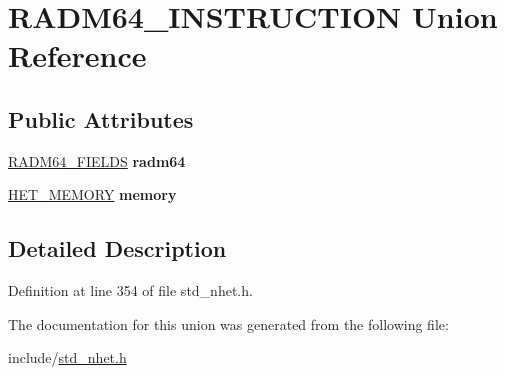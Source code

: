 \hypertarget{unionRADM64__INSTRUCTION}{}\section{R\+A\+D\+M64\+\_\+\+I\+N\+S\+T\+R\+U\+C\+T\+I\+ON Union Reference}
\label{unionRADM64__INSTRUCTION}
\subsection*{Public Attributes}
\begin{DoxyCompactItemize}
\item 
\mbox{\label{unionRADM64__INSTRUCTION_a638272421a08bd325643bc0d2bee015d}} 
\mbox{\hyperlink{structRADM64__format}{R\+A\+D\+M64\+\_\+\+F\+I\+E\+L\+DS}} {\bfseries radm64}
\item 
\mbox{\label{unionRADM64__INSTRUCTION_aac238d348b102300e8ea95b94adb5c41}} 
\mbox{\hyperlink{structmemory__format}{H\+E\+T\+\_\+\+M\+E\+M\+O\+RY}} {\bfseries memory}
\end{DoxyCompactItemize}


\subsection{Detailed Description}


Definition at line 354 of file std\+\_\+nhet.\+h.



The documentation for this union was generated from the following file\+:\begin{DoxyCompactItemize}
\item 
include/\mbox{\hyperlink{std__nhet_8h}{std\+\_\+nhet.\+h}}\end{DoxyCompactItemize}
